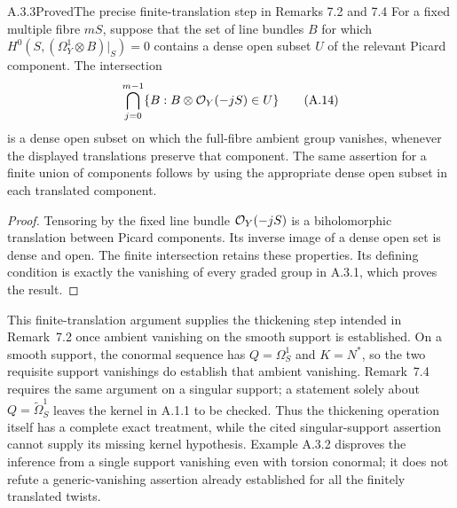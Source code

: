 \begin{statement}{A.3.3}{Proved}{The precise finite-translation step in Remarks 7.2 and 7.4}
For a fixed multiple fibre $mS$, suppose that the set of line bundles $B$ for which $H^0(S,(\Omega_Y^1\otimes B)|_S)=0$ contains a dense open subset $U$ of the relevant Picard component. The intersection
\[
\bigcap_{j=0}^{m-1}\{B:B\otimes\mathcal O_Y(-jS)\in U\}
\tag{A.14}
\]
is a dense open subset on which the full-fibre ambient group vanishes, whenever the displayed translations preserve that component. The same assertion for a finite union of components follows by using the appropriate dense open subset in each translated component.
\end{statement}
\begin{proof}
Tensoring by the fixed line bundle $\mathcal O_Y(-jS)$ is a biholomorphic translation between Picard components. Its inverse image of a dense open set is dense and open. The finite intersection retains these properties. Its defining condition is exactly the vanishing of every graded group in A.3.1, which proves the result.
\end{proof}

This finite-translation argument supplies the thickening step intended in Remark~7.2 once ambient vanishing on the smooth support is established. On a smooth support, the conormal sequence has $Q=\Omega_S^1$ and $K=N^*$, so the two requisite support vanishings do establish that ambient vanishing. Remark~7.4 requires the same argument on a singular support; a statement solely about $Q=\widetilde\Omega_S^1$ leaves the kernel in A.1.1 to be checked. Thus the thickening operation itself has a complete exact treatment, while the cited singular-support assertion cannot supply its missing kernel hypothesis. Example A.3.2 disproves the inference from a single support vanishing even with torsion conormal; it does not refute a generic-vanishing assertion already established for all the finitely translated twists.



